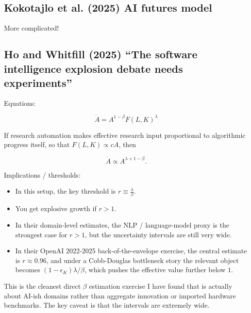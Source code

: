 \documentclass[
  11pt,
  letterpaper,
  DIV=11,
  numbers=noendperiod]{scrartcl}
\providecommand{\tightlist}{%
  \setlength{\itemsep}{0pt}\setlength{\parskip}{0pt}}
\begin{document}
\subsection{Kokotajlo et al. (2025) AI futures
model}\label{kokotajlo2025aifuturesmodel-ai-futures-model}

More complicated!

\subsection{Ho and Whitfill (2025) ``The software intelligence explosion
debate needs
experiments''}\label{ho2025explosionexperiments-the-software-intelligence-explosion-debate-needs-experiments}

Equations:

\[\dot{A} = A^{1-\beta}F(L,K)^\lambda\]

If research automation makes effective research input proportional to
algorithmic progress itself, so that \(F(L,K)\propto cA\), then

\[\dot{A} \propto A^{\lambda+1-\beta}.\]

Implications / thresholds:

\begin{itemize}
\tightlist
\item
  In this setup, the key threshold is \(r\equiv\frac{\lambda}{\beta}\).
\item
  You get explosive growth if \(r>1\).
\item
  In their domain-level estimates, the NLP / language-model proxy is the
  strongest case for \(r>1\), but the uncertainty intervals are still
  very wide.
\item
  In their OpenAI 2022-2025 back-of-the-envelope exercise, the central
  estimate is \(r \approx 0.96\), and under a Cobb-Douglas bottleneck
  story the relevant object becomes \((1-\epsilon_K)\lambda/\beta\),
  which pushes the effective value further below \(1\).
\end{itemize}

This is the cleanest direct \(\beta\) estimation exercise I have found
that is actually about AI-ish domains rather than aggregate innovation
or imported hardware benchmarks. The key caveat is that the intervals
are extremely wide.
\end{document}
